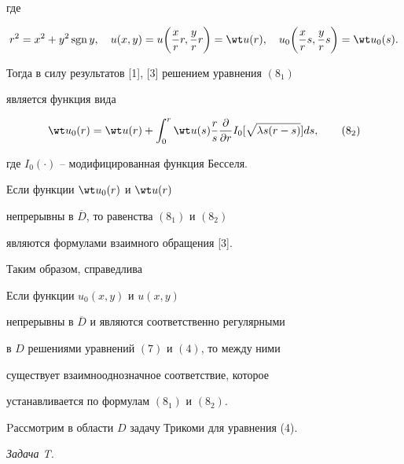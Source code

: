 где


$$


r^2=x^2+y^2\sgn y,\quad u(x,y)=u\bigg(\frac {x}{r}r,\frac {y}{r}r\bigg)=


\wt u(r),\quad u_0\bigg(\frac {x}{r}s,\frac {y}{r}s\bigg)=\wt u_0(s).


$$


Тогда в силу результатов [1], [3] решением уравнения $(8_1)$


является функция вида


\begin{equation}


\wt u_0(r)=\wt u(r)+\int_0^r \wt u(s)\frac {r}{s}


\frac {\partial }{\partial r}


I_0[\sqrt {\lambda s(r-s)}]ds, \tag{8$_2$}


\end{equation}


где $I_0(\cdot )$ -- модифицированная функция Бесселя.





Если функции $\wt u_0(r)$ и $\wt u(r)$


непрерывны в $\overline D$, то равенства $(8_1)$ и $(8_2)$


являются формулами взаимного обращения [3].





Таким образом, справедлива 





\begin{thm}


Если функции $u_0(x,y)$ и $u(x,y)$


непрерывны в $\overline D$ и являются соответственно регулярными


в $D$ решениями уравнений $(7)$ и $(4)$, то между ними


существует взаимнооднозначное соответствие, которое


устанавливается по формулам $(8_1)$ и $(8_2)$.


\end{thm}





Pассмотрим в области $D$ задачу Трикоми для уравнения (4).





{\it Задача T.}


